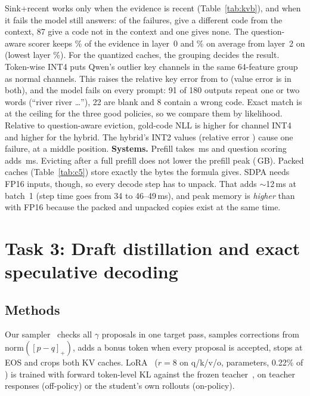 \documentclass{article}
\begin{document}
Sink+recent works only when the evidence is recent (Table~\ref{tab:kvb}), and when it fails the model still answers: of the \SinkWrong{} failures, \SinkInCtx{} give a different code from the context, 87 give a code not in the context and one gives none. The question-aware scorer keeps \QaEvLzero\% of the evidence in layer~0 and \QaEvLtwo\% on average from layer~2 on (lowest layer \QaEvLtwoMin\%).
For the quantized caches, the grouping decides the result. Token-wise INT4 puts Qwen's outlier key channels in the same 64-feature group as normal channels. This raises the relative key error from \KvKmseKivi{} to \KvKmseTok{} (value error is \KvVmse{} in both), and the model fails on every prompt: 91 of 180 outputs repeat one or two words (``river river \dots''), 22 are blank and 8 contain a wrong code.
Exact match is at the ceiling for the three good policies, so we compare them by likelihood. Relative to question-aware eviction, gold-code NLL is \KvNllKiviQa{} higher for channel INT4 and \KvNllHybQa{} higher for the hybrid. The hybrid's INT2 values (relative error \KvVmseHyb) cause one failure, at a middle position.
\textbf{Systems.} Prefill takes \KvPrefill\,ms and question scoring adds \KvScoring\,ms. Evicting after a full prefill does not lower the prefill peak (\KvPrefillPeak\,GB). Packed caches (Table~\ref{tab:c5}) store exactly the bytes the formula gives. SDPA needs FP16 inputs, though, so every decode step has to unpack. That adds $\sim$12\,ms at batch~1 (step time goes from 34 to 46--49\,ms), and peak memory is \emph{higher} than with FP16 because the packed and unpacked copies exist at the same time.

\section{Task 3: Draft distillation and exact speculative decoding}\label{sec:t3}
\subsection{Methods}
Our sampler~\cite{leviathan,chen2023} checks all $\gamma$ proposals in one target pass, samples corrections from $\mathrm{norm}([p-q]_+)$, adds a bonus token when every proposal is accepted, stops at EOS and crops both KV caches.
LoRA~\cite{lora} ($r{=}8$ on q/k/v/o, \AdapterParams{} parameters, 0.22\% of \StudentParams) is trained with forward token-level KL against the frozen \TeacherParams{} teacher~\cite{distillspec,gkd}, on teacher responses (off-policy) or the student's own rollouts (on-policy).
\end{document}
